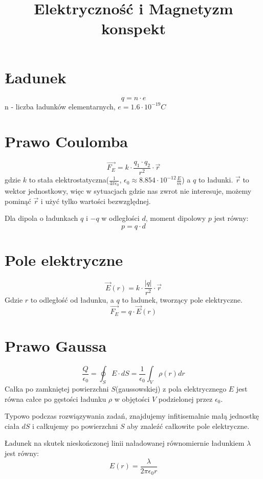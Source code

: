\documentclass{../konspekt}
\title{Elektryczność i Magnetyzm konspekt}
\begin{document}
\begin{multicols}{2}

  \section{Ładunek}

  $$
  q = n \cdot e
  $$
  n - liczba ładunków elementarnych, $e = 1.6 \cdot 10^{-19} C$

  \section{Prawo Coulomba}

  $$
  \vec{F_E} = k \cdot \frac{q_1 \cdot q_2}{r^2} \cdot \vec{r}
  $$
  gdzie $k$ to stała elektrostatyczna($\frac{1}{4\pi\epsilon_0}$,
  $\epsilon_0\approx8.854\cdot10^{-12}\frac{E}{m}$) a $q$ to ładunki.
  $\vec{r}$ to wektor jednostkowy, więc w sytuacjach gdzie nas zwrot
  nie interesuje, możemy pominąć $\vec{r}$ i użyć tylko wartości bezwzględnej.

  Dla dipola o ładunkach $q$ i $-q$ w odległości $d$, moment dipolowy
  $p$ jest równy:
  $$
  p = q \cdot d
  $$

  \section{Pole elektryczne}

  $$
  \vec{E}(r) = k \cdot \frac{|q|}{r^2} \cdot \vec{r}
  $$
  Gdzie $r$ to odległość od ładunku, a $q$ to ładunek, tworzący pole
  elektryczne.
  $$
  \vec{F_E} = q \cdot \vec{E}(r)
  $$

  \section{Prawo Gaussa}

  $$
  \frac{Q}{\epsilon_0} = \oint_S E \cdot dS = \frac{1}{\epsilon_0}
  \int_V \rho(r) dr
  $$
  Całka po zamkniętej powierzchni $S$(gaussowskiej) z pola
  elektrycznego $E$ jest równa całce po gęstości ładunku $\rho$ w
  objętości $V$ podzielonej przez $\epsilon_0$.

  Typowo podczas rozwiązywania zadań, znajdujemy infitisemalnie małą jednostkę
  ciała $dS$ i całkujemy po powierzchni $S$ aby znaleźć całkowite pole
  elektryczne.

  Ładunek na skutek nieskończonej linii naładowanej równomiernie
  ładunkiem $\lambda$ jest równy:
  $$
  E(r) = \frac{\lambda}{2\pi\epsilon_0 r}
  $$


\end{multicols}
\end{document}
